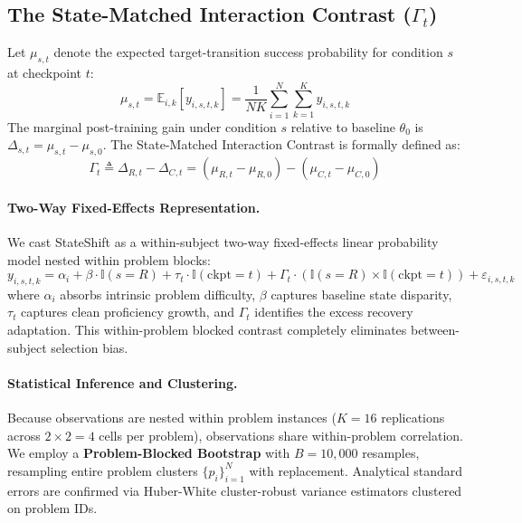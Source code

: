 \documentclass[11pt]{article}
\begin{document}
\subsection{The State-Matched Interaction Contrast \texorpdfstring{($\Gamma_t$)}{(Gamma\_t)}}
Let $\mu_{s,t}$ denote the expected target-transition success probability for condition $s$ at checkpoint $t$:
\begin{equation}
\mu_{s,t} = \mathbb{E}_{i,k}[y_{i,s,t,k}] = \frac{1}{N K} \sum_{i=1}^N \sum_{k=1}^K y_{i,s,t,k}
\end{equation}
The marginal post-training gain under condition $s$ relative to baseline $\theta_0$ is $\Delta_{s,t} = \mu_{s,t} - \mu_{s,0}$. The State-Matched Interaction Contrast is formally defined as:
\begin{equation}
\Gamma_t \triangleq \Delta_{R,t} - \Delta_{C,t} = (\mu_{R,t} - \mu_{R,0}) - (\mu_{C,t} - \mu_{C,0})
\end{equation}

\paragraph{Two-Way Fixed-Effects Representation.}
We cast StateShift as a within-subject two-way fixed-effects linear probability model nested within problem blocks:
\begin{equation}
y_{i,s,t,k} = \alpha_i + \beta \cdot \mathbb{I}(s = R) + \tau_t \cdot \mathbb{I}(\text{ckpt} = t) + \Gamma_t \cdot (\mathbb{I}(s = R) \times \mathbb{I}(\text{ckpt} = t)) + \varepsilon_{i,s,t,k}
\end{equation}
where $\alpha_i$ absorbs intrinsic problem difficulty, $\beta$ captures baseline state disparity, $\tau_t$ captures clean proficiency growth, and $\Gamma_t$ identifies the excess recovery adaptation. This within-problem blocked contrast completely eliminates between-subject selection bias.

\paragraph{Statistical Inference and Clustering.}
Because observations are nested within problem instances ($K=16$ replications across $2 \times 2 = 4$ cells per problem), observations share within-problem correlation. We employ a \textbf{Problem-Blocked Bootstrap} with $B=10,000$ resamples, resampling entire problem clusters $\{p_i\}_{i=1}^N$ with replacement. Analytical standard errors are confirmed via Huber-White cluster-robust variance estimators clustered on problem IDs.
\end{document}
